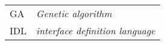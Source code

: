 \begin{longtable}{ll}
  GA & \textit{Genetic algorithm} \\
  IDL & \textit{interface definition language}\\
\end{longtable}

